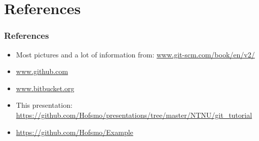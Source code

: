 \section[References]{References}
\begin{frame}
	\frametitle{References}
	\begin{itemize}
		\item Most pictures and a lot of information from:
				\url{www.git-scm.com/book/en/v2/}
		\item \url{www.github.com}
		\item \url{www.bitbucket.org}
		\item This presentation:
				\url{https://github.com/Hofsmo/presentations/tree/master/NTNU/git_tutorial}
		\item \url{https://github.com/Hofsmo/Example}
	\end{itemize}
\end{frame}
